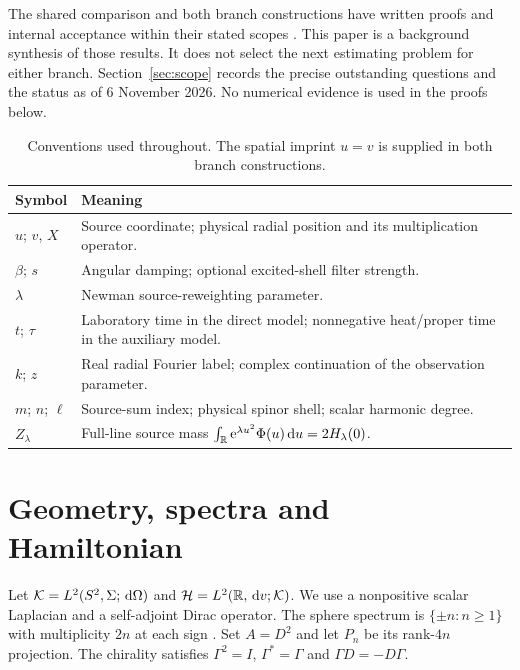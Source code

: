 The shared comparison and both branch constructions have written proofs
and internal acceptance within their stated scopes
\cite{TNDParent,TNDSharedReview,TNDDirect,TNDDirectReview,TNDAux,TNDAuxReview}.
This paper is a background synthesis of those results. It does not select
the next estimating problem for either branch. Section~\ref{sec:scope}
records the precise outstanding questions and the status as of 6 November
2026. No numerical evidence is used in the proofs below.

\begin{table}[ht]
\centering\small
\begin{tabularx}{\textwidth}{@{}lY@{}}\toprule
Symbol & Meaning \\\midrule
$u$; $v$, $X$ & Source coordinate; physical radial position and its multiplication operator. \\
$\beta$; $s$ & Angular damping; optional excited-shell filter strength. \\
$\lambda$ & Newman source-reweighting parameter. \\
$t$; $\tau$ & Laboratory time in the direct model; nonnegative heat/proper time in the auxiliary model. \\
$k$; $z$ & Real radial Fourier label; complex continuation of the observation parameter. \\
$m$; $n$; $\ell$ & Source-sum index; physical spinor shell; scalar harmonic degree. \\
$Z_\lambda$ & Full-line source mass $\int_\mathbb R\mathrm e^{\lambda u^2}\Phi(u)\,\mathrm d u=2H_\lambda(0)$. \\
\bottomrule\end{tabularx}
\caption{Conventions used throughout. The spatial imprint $u=v$ is supplied
in both branch constructions.}
\end{table}

\section{Geometry, spectra and Hamiltonian}\label{sec:geometry}

Let $\mathcal K=L^2(S^2,\Sigma;\,\mathrm d\Omega)$ and
$\mathcal H=L^2(\mathbb R,\,\mathrm d v;\mathcal K)$. We use a nonpositive scalar Laplacian and
a self-adjoint Dirac operator. The sphere spectrum is
$\{\pm n:n\ge1\}$ with multiplicity $2n$ at each sign
\cite[(3.40), (3.54)]{CamporesiHiguchi1996}.
Set $A=D^2$ and let $P_n$ be its rank-$4n$ projection.
The chirality satisfies $\Gamma^2=I$, $\Gamma^*=\Gamma$ and
$\Gamma D=-D\Gamma$.


